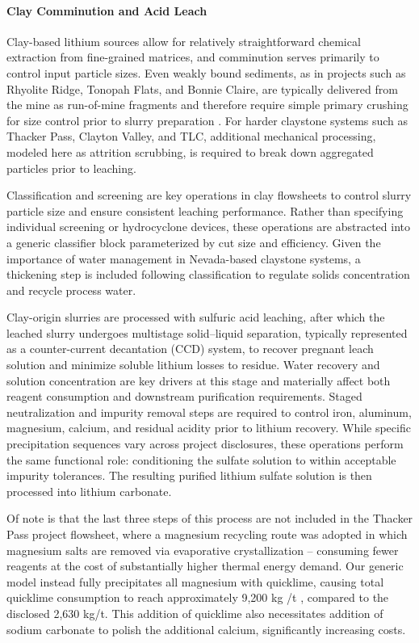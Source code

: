 \paragraph{Clay Comminution and Acid Leach}\label{app:04-methods-facilitychoices-clayleach}
Clay-based lithium sources allow for relatively straightforward chemical extraction from fine-grained matrices, and comminution serves primarily to control input particle sizes. Even weakly bound sediments, as in projects such as Rhyolite Ridge, Tonopah Flats, and Bonnie Claire, are typically delivered from the mine as run-of-mine fragments and therefore require simple primary crushing for size control prior to slurry preparation \citep{khakmardanLifeCycleAssessment2024, mousavinezhadNextLithiumBoom2025}. For harder claystone systems such as Thacker Pass, Clayton Valley, and TLC, additional mechanical processing, modeled here as attrition scrubbing, is required to break down aggregated particles prior to leaching.

Classification and screening are key operations in clay flowsheets to control slurry particle size and ensure consistent leaching performance. Rather than specifying individual screening or hydrocyclone devices, these operations are abstracted into a generic classifier block parameterized by cut size and efficiency. Given the importance of water management in Nevada-based claystone systems, a thickening step is included following classification to regulate solids concentration and recycle process water.

Clay-origin slurries are processed with sulfuric acid leaching, after which the leached slurry undergoes multistage solid--liquid separation, typically represented as a counter-current decantation (CCD) system, to recover pregnant leach solution and minimize soluble lithium losses to residue. Water recovery and solution concentration are key drivers at this stage and materially affect both reagent consumption and downstream purification requirements. Staged neutralization and impurity removal steps are required to control iron, aluminum, magnesium, calcium, and residual acidity prior to lithium recovery. While specific precipitation sequences vary across project disclosures, these operations perform the same functional role: conditioning the sulfate solution to within acceptable impurity tolerances. The resulting purified lithium sulfate solution is then processed into lithium carbonate.

Of note is that the last three steps of this process are not included in the Thacker Pass project flowsheet, where a magnesium recycling route was adopted in which magnesium salts are removed via evaporative crystallization -- consuming fewer reagents at the cost of substantially higher thermal energy demand. Our generic model instead fully precipitates all magnesium with quicklime, causing total quicklime consumption to reach approximately 9,200 kg /t , compared to the disclosed 2,630 kg/t. This addition of quicklime also necessitates addition of sodium carbonate to polish the additional calcium, significantly increasing costs.

